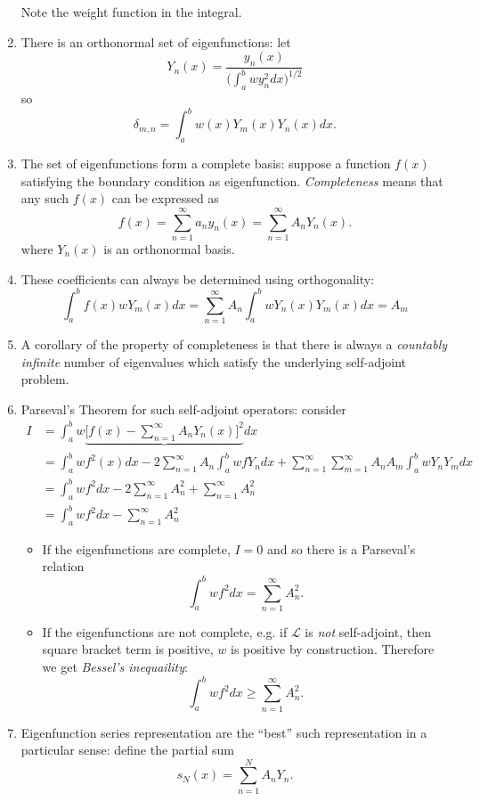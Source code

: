 \documentclass[a4paper]{article}
\renewcommand*\L{\mathcal{L}}
\begin{document}
\begin{enumerate}
Note the weight function in the integral.
\item There is an orthonormal set of eigenfunctions: let
  \[
    Y_n(x) = \frac{y_n(x)}{\big(\int_{a}^{b} wy_n^2 dx \big)^{1/2}}
  \]
  so
  \[
\delta_{m,n}=\int_{a}^{b} w(x)Y_m(x)Y_n(x) dx.
  \]
\item The set of eigenfunctions form a complete basis: suppose a function \(f(x)\) satisfying the boundary condition as eigenfunction. \emph{Completeness} means that any such \(f(x)\) can be expressed as
  \[
f(x) = \sum_{n=1}^{\infty}a_ny_n(x) = \sum_{n=1}^{\infty} A_n Y_n(x).
  \]
  where \(Y_n(x)\) is an orthonormal basis.
\item These coefficients can always be determined using orthogonality:
  \[
\int_{a}^{b} f(x)wY_m(x) dx = \sum_{n=1}^{\infty}A_n \int_{a}^{b} wY_n(x)Y_m(x) dx = A_m
\]
\item A corollary of the property of completeness is that there is always a \emph{countably infinite} number of eigenvalues which satisfy the underlying self-adjoint problem.
\item Parseval's Theorem for such self-adjoint operators: consider
  \begin{align*}
    I &= \int_{a}^{b} w \underbrace{\Big[ f(x) - \sum_{n=1}^{\infty}A_nY_n(x) \Big]^2} dx \\
      &= \int_{a}^{b} w f^2(x) dx - 2 \sum_{n=1}^{\infty}A_n \int_{a}^{b} w fY_n dx + \sum_{n=1}^{\infty}\sum_{m=1}^{\infty} A_nA_m \int_{a}^{b} wY_nY_m dx \\
      &=\int_{a}^{b} w f^2 dx -2 \sum_{n=1}^{\infty}A_n^2 + \sum_{n=1}^{\infty}A_n^2 \\
      &= \int_{a}^{b} wf^2 dx - \sum_{n=1}^{\infty} A_n^2
  \end{align*}
  \begin{itemize}
  \item If the eigenfunctions are complete, \(I=0\) and so there is a Parseval's relation
  \[
\int_{a}^{b} wf^2 dx = \sum_{n=1}^{\infty}A_n^2.
  \]
\item If the eigenfunctions are not complete, e.g. if \(\L\) is \emph{not} self-adjoint, then square bracket term is positive, \(w\) is positive by construction. Therefore we get \emph{Bessel's inequaility}:
  \[
\int_{a}^{b} wf^2 dx \geq \sum_{n=1}^{\infty}A_n^2.
  \]
  \end{itemize}
\item Eigenfunction series representation are the ``best'' such representation in a particular sense: define the partial sum
  \[
    s_N(x) = \sum_{n=1}^{N}A_nY_n.
\]
\end{enumerate}
\end{document}
